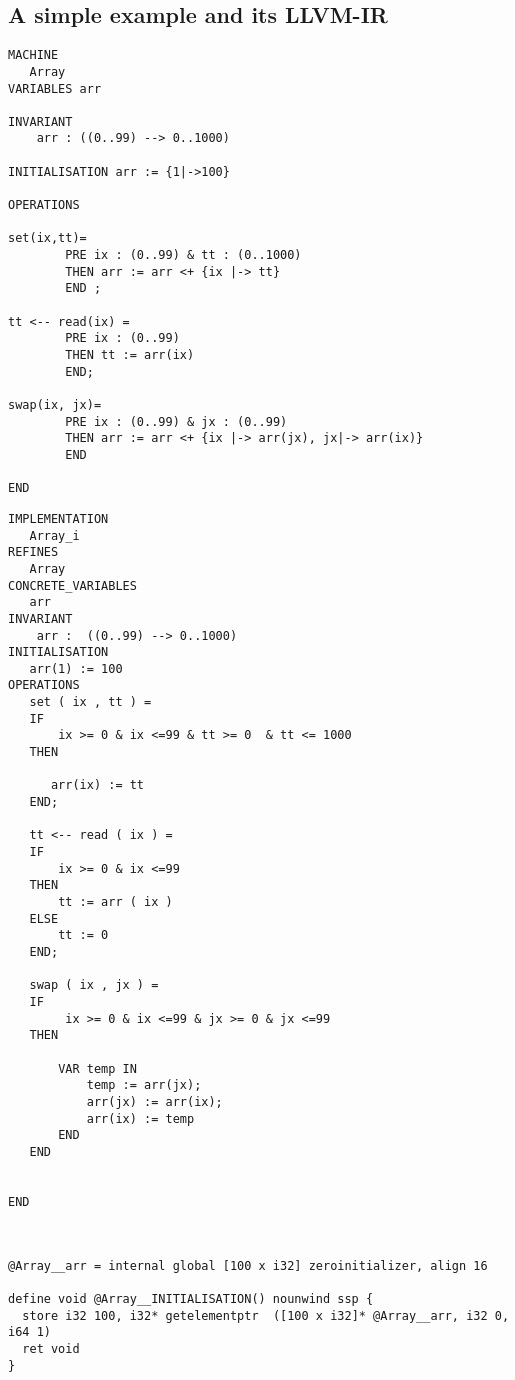 \documentclass[10pt,a4paper]{article}
\begin{document}
\subsection{A  simple example and its LLVM-IR}
\footnotesize{
\begin{verbatim}
MACHINE
   Array
VARIABLES arr

INVARIANT 
    arr : ((0..99) --> 0..1000)

INITIALISATION arr := {1|->100}

OPERATIONS 

set(ix,tt)=
        PRE ix : (0..99) & tt : (0..1000)
        THEN arr := arr <+ {ix |-> tt}
        END ;

tt <-- read(ix) =
        PRE ix : (0..99)
        THEN tt := arr(ix)
        END;

swap(ix, jx)=
        PRE ix : (0..99) & jx : (0..99)
        THEN arr := arr <+ {ix |-> arr(jx), jx|-> arr(ix)}
        END

END
\end{verbatim}

\begin{verbatim}
IMPLEMENTATION 
   Array_i
REFINES
   Array
CONCRETE_VARIABLES
   arr
INVARIANT 
    arr :  ((0..99) --> 0..1000)
INITIALISATION
   arr(1) := 100
OPERATIONS
   set ( ix , tt ) =
   IF
       ix >= 0 & ix <=99 & tt >= 0  & tt <= 1000
   THEN
       
      arr(ix) := tt 
   END;

   tt <-- read ( ix ) =
   IF
       ix >= 0 & ix <=99
   THEN
       tt := arr ( ix )
   ELSE
       tt := 0
   END;

   swap ( ix , jx ) =
   IF
        ix >= 0 & ix <=99 & jx >= 0 & jx <=99 
   THEN

       VAR temp IN
           temp := arr(jx);
           arr(jx) := arr(ix);
           arr(ix) := temp
       END
   END


END


\end{verbatim}




\begin{verbatim}

@Array__arr = internal global [100 x i32] zeroinitializer, align 16

define void @Array__INITIALISATION() nounwind ssp {
  store i32 100, i32* getelementptr  ([100 x i32]* @Array__arr, i32 0, i64 1)
  ret void
}


\end{verbatim}}
\end{document}
